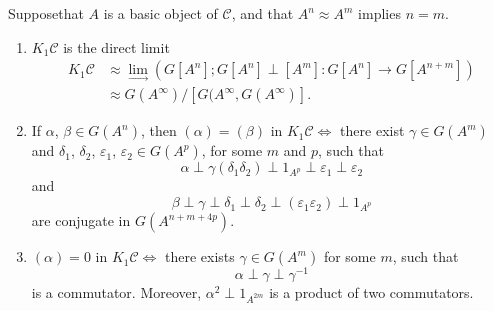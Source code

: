 \begin{theorem}\label{chap1:thm3.2}%
Suppose\pageoriginale that $A$ is a basic object of $\mathscr{C}$, and
that $A^n \approx A^m$ implies $n =m$.  
\begin{enumerate}
\renewcommand{\theenumi}{\alph{enumi}}
\renewcommand{\labelenumi}{(\theenumi)}
\item $K_1 \mathscr{C}$ is the direct limit
\begin{align*}
K_1 \mathscr{C} & \approx \lim \limits_{\to} (G [A^n]; G[A^n] \perp
[A^m] : G[A^n] \to G[A^{n+m}])\\ 
& \approx G(A^{\infty}) / [G(A^{\infty}, G(A^{\infty})]. 
\end{align*}

\item If $\alpha$, $\beta \in G(A^n)$, then $(\alpha) = (\beta) $ in
  $K_1 \mathscr{C} \Leftrightarrow$ there exist $\gamma \in G(A^m)$
  and $\delta_1$, $\delta_2$, $\varepsilon_1$, $\varepsilon_2 \in
  G(A^p)$, for some $m$ and $p$, such that 
$$
\alpha \perp \gamma(\delta_1 \delta_2) \perp 1_{A^p} \perp
\varepsilon_1 \perp \varepsilon_2 
$$
and 
$$
\beta \perp \gamma \perp \delta_1 \perp \delta_2 \perp (\varepsilon_1
\varepsilon_2) \perp 1_{A^p} 
$$
are conjugate in $G(A^{n + m + 4p})$.

\item $(\alpha) = 0$ in $K_1 \mathscr{C} \Leftrightarrow$ there exists 
  $\gamma \in G(A^m)$ for some $m$, such that  
$$
\alpha \perp \gamma \perp \gamma^{-1} 
$$
is a commutator. Moreover, $\alpha^2 \perp 1_{A^{2m}}$ is a product of
two commutators. 
\end{enumerate}
\end{theorem} 


